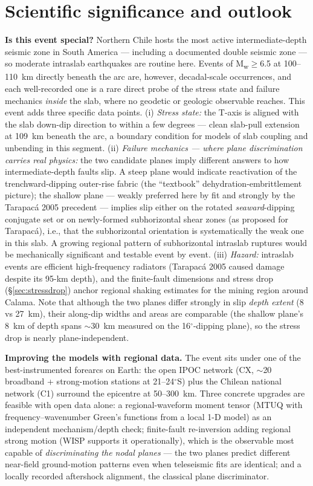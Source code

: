 \documentclass[11pt]{article}
\newcommand{\Mw}{M\textsubscript{w}}
\begin{document}
\section{Scientific significance and outlook}
\textbf{Is this event special?} Northern Chile hosts the most active intermediate-depth
seismic zone in South America --- including a documented double seismic zone --- so moderate
intraslab earthquakes are routine here. Events of \Mw$\geq$6.5 at 100--110~km directly
beneath the arc are, however, decadal-scale occurrences, and each well-recorded one is a rare
direct probe of the stress state and failure mechanics \emph{inside} the slab, where no
geodetic or geologic observable reaches. This event adds three specific data points.
(i) \emph{Stress state:} the T-axis is aligned with the slab down-dip direction to within a
few degrees --- clean slab-pull extension at 109~km beneath the arc, a boundary condition for
models of slab coupling and unbending in this segment. (ii) \emph{Failure mechanics --- where
plane discrimination carries real physics:} the two candidate planes imply different answers
to how intermediate-depth faults slip. A steep plane would indicate reactivation of the
trenchward-dipping outer-rise fabric (the ``textbook'' dehydration-embrittlement picture); the
shallow plane --- weakly preferred here by fit and strongly by the Tarapac\'a 2005 precedent
--- implies slip either on the rotated \emph{seaward}-dipping conjugate set or on
newly-formed subhorizontal shear zones (as proposed for Tarapac\'a), i.e., that the
subhorizontal orientation is systematically the weak one in this slab. A growing regional
pattern of subhorizontal intraslab ruptures would be mechanically significant and testable
event by event. (iii) \emph{Hazard:} intraslab events are efficient high-frequency radiators
(Tarapac\'a 2005 caused damage despite its 95-km depth), and the finite-fault dimensions and
stress drop (\S\ref{sec:stressdrop}) anchor regional shaking estimates for the mining region
around Calama. Note that although the two planes differ strongly in slip \emph{depth extent}
(8 vs 27~km), their along-dip widths and areas are comparable (the shallow plane's 8~km of
depth spans $\sim$30~km measured on the 16$^\circ$-dipping plane), so the stress drop is
nearly plane-independent.

\textbf{Improving the models with regional data.} The event sits under one of the
best-instrumented forearcs on Earth: the open IPOC network (CX, $\sim$20 broadband +
strong-motion stations at 21--24$^\circ$S) plus the Chilean national network (C1) surround
the epicentre at 50--300~km. Three concrete upgrades are feasible with open data alone: a
regional-waveform moment tensor (MTUQ with frequency--wavenumber Green's functions from a
local 1-D model) as an independent mechanism/depth check; finite-fault re-inversion adding
regional strong motion (WISP supports it operationally), which is the observable most capable
of \emph{discriminating the nodal planes} --- the two planes predict different near-field
ground-motion patterns even when teleseismic fits are identical; and a locally recorded
aftershock alignment, the classical plane discriminator.
\end{document}
